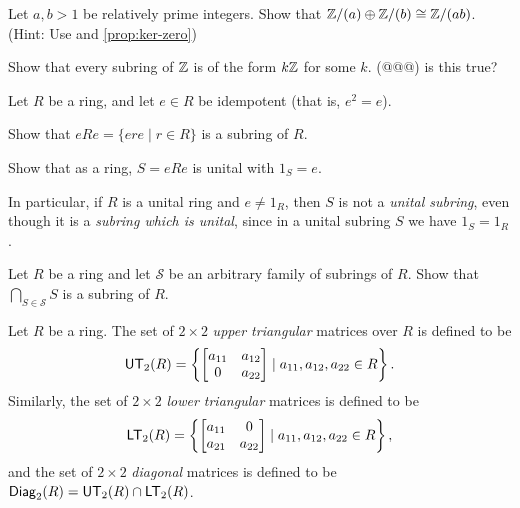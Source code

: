 \begin{exercise}
Let \(a, b > 1\) be relatively prime integers.
Show that \(\mathbb{Z}/(a) \oplus \mathbb{Z}/(b) \cong \mathbb{Z}/(ab)\).
(Hint: Use  and \ref{prop:ker-zero})
\end{exercise}

\begin{exercise}
Show that every subring of \(\mathbb{Z}\) is of the form \(k\mathbb{Z}\) for some \(k\).
(@@@) is this true?
\end{exercise}

\begin{exercise}
Let \(R\) be a ring, and let \(e \in R\) be idempotent (that is, \(e^2 = e\)).
\begin{proplist*}
\item Show that \(eRe = \{ ere \mid r \in R \}\) is a subring of \(R\).
\item Show that as a ring, \(S = eRe\) is unital with \(1_S = e\).
\end{proplist*}
In particular, if \(R\) is a unital ring and \(e \neq 1_R\), then \(S\) is not a \emph{unital subring}, even though it is a \emph{subring which is unital}, since in a unital subring \(S\) we have \(1_S = 1_R\).
\end{exercise}

\begin{exercise}
Let \(R\) be a ring and let \(\mathcal{S}\) be an arbitrary family of subrings of \(R\).
Show that \(\bigcap_{S \in \mathcal{S}} S\) is a subring of \(R\).
\end{exercise}

\begin{dfn} \label{dfn:triangular-diagonal-matrix}
Let \(R\) be a ring.
The set of \(2 \times 2\) \emph{upper triangular} matrices over \(R\) is defined to be \[ \mathsf{UT}_{2}(R) = \left\{ \begin{bmatrix} a_{11} & a_{12} \\ 0 & a_{22} \end{bmatrix} \mid a_{11}, a_{12}, a_{22} \in R \right\}. \] Similarly, the set of \(2 \times 2\) \emph{lower triangular} matrices is defined to be \[ \mathsf{LT}_{2}(R) = \left\{ \begin{bmatrix} a_{11} & 0 \\ a_{21} & a_{22} \end{bmatrix} \mid a_{11}, a_{12}, a_{22} \in R \right\}, \] and the set of \(2 \times 2\) \emph{diagonal} matrices is defined to be \(\mathsf{Diag}_{2}(R) = \mathsf{UT}_{2}(R) \cap \mathsf{LT}_{2}(R)\).
\end{dfn}

